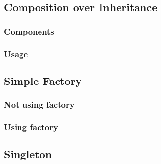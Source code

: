 \documentclass[10pt,letterpaper]{article}
\begin{document}
\subsection{Composition over Inheritance}
\subsubsection{Components}
\label{code:coi-component}
\subsubsection{Usage}
\label{code:coi-usage}

\subsection{Simple Factory}
\label{code:simple-factory}
\subsubsection{Not using factory}

\subsubsection{Using factory}


\subsection{Singleton}
\label{code:singleton}

\end{document}
